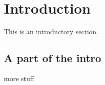 \section{Introduction}

This is an introductory section.

\subsection{A part of the intro}
more stuff